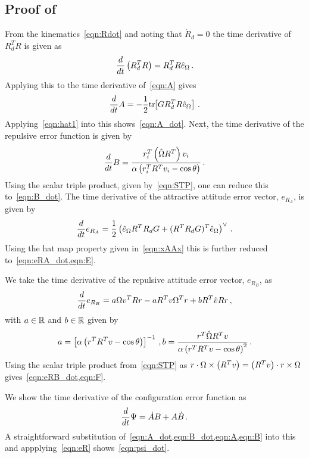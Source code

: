 \documentclass[letterpaper, 10 pt, conference]{ieeeconf}  %
\begin{document}
\subsection{Proof of~}\label{proof:error_dyn}
From the kinematics~\cref{eqn:Rdot} and noting that \( \dot{R}_d = 0 \) the time derivative of \( R_d^T R \) is given as
\begin{gather*}
	\frac{d }{d t} \left( R_d^T R \right) = R_d^T R \hat{e}_\Omega \, .
\end{gather*}
Applying this to the time derivative of~\cref{eqn:A} gives
\begin{gather*}
	\frac{d }{d t} A = -\frac{1}{2} \mathrm{tr}\negthickspace\left[ G R_d^T R \hat{e}_\Omega \right] \, .
\end{gather*}
Applying~\cref{eqn:hat1} into this shows~\cref{eqn:A_dot}.
Next, the time derivative of the repulsive error function is given by
\begin{gather*}
	\frac{d }{d t} B = \frac{r_i^T \left( \hat{\Omega} R^T \right) v_i}{\alpha \left( r_i^T R^T v_i - \cos \theta \right)} \, .
\end{gather*}
Using the scalar triple product, given by~\cref{eqn:STP}, one can reduce this to~\cref{eqn:B_dot}.
The time derivative of the attractive attitude error vector, \( e_{R_A} \), is given by
\begin{gather*}
	\frac{d }{d t} e_{R_A} = \frac{1}{2} \left( \hat{e}_\Omega R^T R_d G + (R^T R_d G)^T \hat{e}_\Omega \right)^\vee \, .
\end{gather*}
Using the hat map property given in~\cref{eqn:xAAx} this is further reduced to~\cref{eqn:eRA_dot,eqn:E}.

We take the time derivative of the repulsive attitude error vector, \( e_{R_B} \), as
\begin{gather*}
	\frac{d }{d t} e_{R_B} = a \Omega v^T R r - a R^T v \Omega^T r + b R^T \hat{v} R r \, ,
\end{gather*}
with \( a \in \mathbb{R} \) and \( b \in \mathbb{R}\) given by 
\begin{gather*}
	a = \left[ \alpha \left( r^T R^T v - \cos \theta \right) \right]^{-1} \, ,
	b = \frac{r^T \hat{\Omega} R^T v}{\alpha \left( r^T R^T v - \cos \theta \right)^2} \, .
\end{gather*}
Using the scalar triple product from~\cref{eqn:STP} as \( r \cdot \Omega \times \left( R^T v \right) = \left( R^T v \right) \cdot r \times \Omega \) gives~\cref{eqn:eRB_dot,eqn:F}.

We show the time derivative of the configuration error function as
\begin{gather*}
	\frac{d }{d t} \Psi = \dot{A} B + A \dot{B} \, .
\end{gather*}
A straightforward substitution of~\cref{eqn:A_dot,eqn:B_dot,eqn:A,eqn:B} into this and appplying~\cref{eqn:eR} shows~\cref{eqn:psi_dot}.
\end{document}
